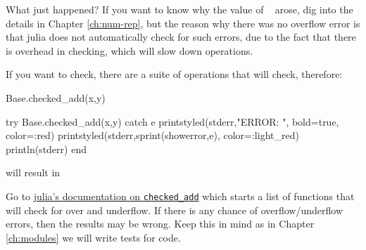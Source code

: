 What just happened?  If you want to know why the value of \printpythontex[verb]~ arose, dig into the details in Chapter \ref{ch:num-rep}, but the reason why there was no overflow error is that julia does not automatically check for such errors, due to the fact that there is overhead in checking, which will slow down operations.  

If you want to check, there are a suite of operations that will check, therefore:

\begin{jlverbatim}[types2]
Base.checked_add(x,y)
\end{jlverbatim}
\begin{jlcode}[types2]
try
  Base.checked_add(x,y)
catch e
 printstyled(stderr,"ERROR: ", bold=true, color=:red)
 printstyled(stderr,sprint(showerror,e), color=:light_red)
 println(stderr)
end
\end{jlcode}
%
will result in \stderrpythontex[verbatim]

Go to \href{https://docs.julialang.org/en/v1/base/math/#Base.Checked.checked_add}{julia's documentation on \texttt{checked\_add}} which starts a list of functions that will check for over and underflow. If there is any chance of overflow/underflow errors, then the results may be wrong.  Keep this in mind as in Chapter \ref{ch:modules} we will write tests for code. 


%
%

